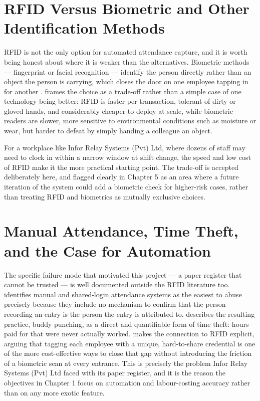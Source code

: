 \section{RFID Versus Biometric and Other Identification Methods}

RFID is not the only option for automated attendance capture, and it is worth being honest about where it is weaker than the alternatives. Biometric methods — fingerprint or facial recognition — identify the person directly rather than an object the person is carrying, which closes the door on one employee tapping in for another \parencite{nialabs2025biometric}. \textcite{peniel2025rfid} frames the choice as a trade-off rather than a simple case of one technology being better: RFID is faster per transaction, tolerant of dirty or gloved hands, and considerably cheaper to deploy at scale, while biometric readers are slower, more sensitive to environmental conditions such as moisture or wear, but harder to defeat by simply handing a colleague an object.

For a workplace like Infor Relay Systems (Pvt) Ltd, where dozens of staff may need to clock in within a narrow window at shift change, the speed and low cost of RFID make it the more practical starting point. The trade-off is accepted deliberately here, and flagged clearly in Chapter 5 as an area where a future iteration of the system could add a biometric check for higher-risk cases, rather than treating RFID and biometrics as mutually exclusive choices.

\section{Manual Attendance, Time Theft, and the Case for Automation}

The specific failure mode that motivated this project — a paper register that cannot be trusted — is well documented outside the RFID literature too. \textcite{oloid2025buddy} identifies manual and shared-login attendance systems as the easiest to abuse precisely because they include no mechanism to confirm that the person recording an entry is the person the entry is attributed to. \textcite{qandle2025buddy} describes the resulting practice, buddy punching, as a direct and quantifiable form of time theft: hours paid for that were never actually worked. \textcite{cpcon2025rfid} makes the connection to RFID explicit, arguing that tagging each employee with a unique, hard-to-share credential is one of the more cost-effective ways to close that gap without introducing the friction of a biometric scan at every entrance. This is precisely the problem Infor Relay Systems (Pvt) Ltd faced with its paper register, and it is the reason the objectives in Chapter 1 focus on automation and labour-costing accuracy rather than on any more exotic feature.

